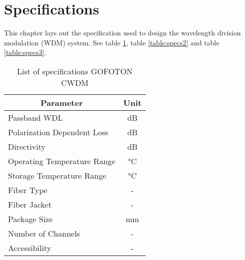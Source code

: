 \section{Specifications}
\label{sec:specifications}
This chapter lays out the specification used to design the wavelength division modulation (WDM) system. See table \ref{table:specs1}, table \ref{table:specs2} and table \ref{table:specs3}.

\begin{table}[!ht]
	\centering
	\cite{noauthor_gofoton_nodate-1}
	\begin{tabular} {|l|c|}
		\hline
		\multicolumn{1}{|c|}{\textbf{Parameter}} & \textbf{Unit} \\ \hline\hline
		Passband WDL & \unit{\dB} \\ \hline
		Polarization Dependent Loss & \unit{\dB} \\ \hline
		Directivity & \unit{\dB} \\ \hline
		Operating Temperature Range & \unit{\degreeCelsius} \\ \hline
		Storage Temperature Range & \unit{\degreeCelsius} \\ \hline
		Fiber Type & - \\ \hline
		Fiber Jacket & - \\ \hline
		Package Size & \unit{\mm} \\ \hline
		Number of Channels & - \\ \hline
		Accessibility & - \\ \hline
	\end{tabular}
	\caption{List of specifications GOFOTON CWDM}
	\label{table:specs1}
\end{table}

